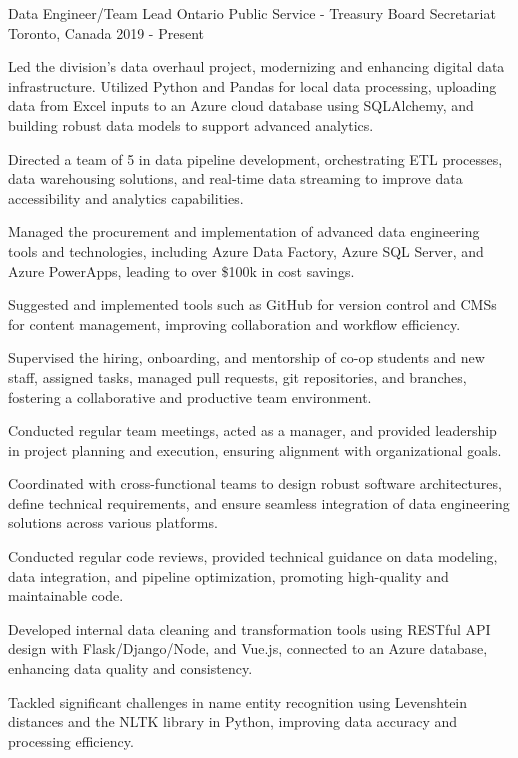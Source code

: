 \begin{cventries}
\cventry
  {Data Engineer/Team Lead}
  {Ontario Public Service - Treasury Board Secretariat}
  {Toronto, Canada}
  {2019 - Present}
  {
    \begin{cvitems}
      \item Led the division's data overhaul project, modernizing and enhancing digital data infrastructure. Utilized Python and Pandas for local data processing, uploading data from Excel inputs to an Azure cloud database using SQLAlchemy, and building robust data models to support advanced analytics.
      \item Directed a team of 5 in data pipeline development, orchestrating ETL processes, data warehousing solutions, and real-time data streaming to improve data accessibility and analytics capabilities.
      \item Managed the procurement and implementation of advanced data engineering tools and technologies, including Azure Data Factory, Azure SQL Server, and Azure PowerApps, leading to over \$100k in cost savings.
      \item Suggested and implemented tools such as GitHub for version control and CMSs for content management, improving collaboration and workflow efficiency.
      \item Supervised the hiring, onboarding, and mentorship of co-op students and new staff, assigned tasks, managed pull requests, git repositories, and branches, fostering a collaborative and productive team environment.
      \item Conducted regular team meetings, acted as a manager, and provided leadership in project planning and execution, ensuring alignment with organizational goals.
      \item Coordinated with cross-functional teams to design robust software architectures, define technical requirements, and ensure seamless integration of data engineering solutions across various platforms.
      \item Conducted regular code reviews, provided technical guidance on data modeling, data integration, and pipeline optimization, promoting high-quality and maintainable code.
      \item Developed internal data cleaning and transformation tools using RESTful API design with Flask/Django/Node, and Vue.js, connected to an Azure database, enhancing data quality and consistency.
      \item Tackled significant challenges in name entity recognition using Levenshtein distances and the NLTK library in Python, improving data accuracy and processing efficiency.
    \end{cvitems}
  }


\end{cventries}
